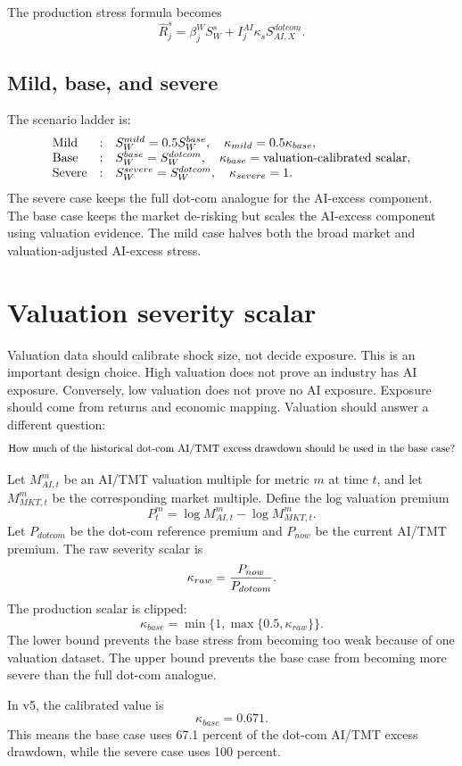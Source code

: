 \documentclass[11pt]{article}
\begin{document}
The production stress formula becomes
\[
\widehat R_j^s
=
\beta_j^W S_W^s+I_j^{AI}\kappa_s S_{AI,X}^{dotcom}.
\]

\subsection{Mild, base, and severe}

The scenario ladder is:
\[
\begin{array}{lll}
\hbox{Mild} &:& S_W^{mild}=0.5S_W^{base},\quad \kappa_{mild}=0.5\kappa_{base},\\
\hbox{Base} &:& S_W^{base}=S_W^{dotcom},\quad \kappa_{base}=\hbox{valuation-calibrated scalar},\\
\hbox{Severe} &:& S_W^{severe}=S_W^{dotcom},\quad \kappa_{severe}=1.
\end{array}
\]
The severe case keeps the full dot-com analogue for the AI-excess component. The base case keeps the market de-risking but scales the AI-excess component using valuation evidence. The mild case halves both the broad market and valuation-adjusted AI-excess stress.

\section{Valuation severity scalar}

Valuation data should calibrate shock size, not decide exposure. This is an important design choice. High valuation does not prove an industry has AI exposure. Conversely, low valuation does not prove no AI exposure. Exposure should come from returns and economic mapping. Valuation should answer a different question:
\[
\hbox{How much of the historical dot-com AI/TMT excess drawdown should be used in the base case?}
\]

Let $M_{AI,t}^m$ be an AI/TMT valuation multiple for metric $m$ at time $t$, and let $M_{MKT,t}^m$ be the corresponding market multiple. Define the log valuation premium
\[
P_t^m=\log M_{AI,t}^m-\log M_{MKT,t}^m.
\]
Let $P_{dotcom}$ be the dot-com reference premium and $P_{now}$ be the current AI/TMT premium. The raw severity scalar is
\[
\kappa_{raw}={P_{now}\over P_{dotcom}}.
\]
The production scalar is clipped:
\[
\kappa_{base}=\min\{1,\max\{0.5,\kappa_{raw}\}\}.
\]
The lower bound prevents the base stress from becoming too weak because of one valuation dataset. The upper bound prevents the base case from becoming more severe than the full dot-com analogue.

In v5, the calibrated value is
\[
\kappa_{base}=0.671.
\]
This means the base case uses 67.1 percent of the dot-com AI/TMT excess drawdown, while the severe case uses 100 percent.
\end{document}
